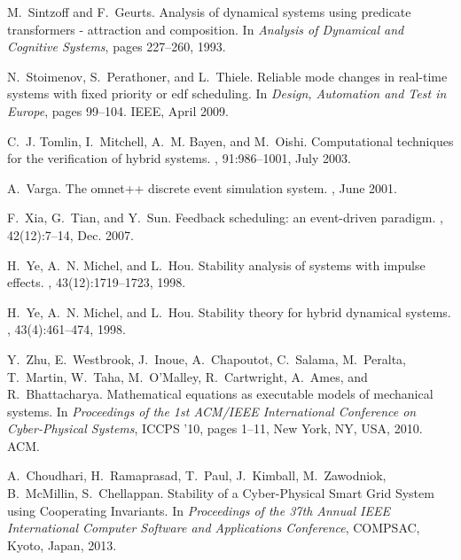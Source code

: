 \documentclass{sig-alternate-ipsn13}
\begin{document}
\begin{thebibliography}{10}
M.~Sintzoff and F.~Geurts.
\newblock Analysis of dynamical systems using predicate transformers -
  attraction and composition.
\newblock In {\em Analysis of Dynamical and Cognitive Systems}, pages 227--260,
  1993.

N.~Stoimenov, S.~Perathoner, and L.~Thiele.
\newblock Reliable mode changes in real-time systems with fixed priority or edf
  scheduling.
\newblock In {\em Design, Automation and Test in Europe}, pages 99--104. IEEE,
  April 2009.

C.~J. Tomlin, I.~Mitchell, A.~M. Bayen, and M.~Oishi.
\newblock Computational techniques for the verification of hybrid systems.
, 91:986--1001, July 2003.

A.~Varga.
\newblock The omnet++ discrete event simulation system.
, June 2001.

F.~Xia, G.~Tian, and Y.~Sun.
\newblock Feedback scheduling: an event-driven paradigm.
, 42(12):7--14, Dec. 2007.

H.~Ye, A.~N. Michel, and L.~Hou.
\newblock Stability analysis of systems with impulse effects.
, 43(12):1719--1723,
  1998.

H.~Ye, A.~N. Michel, and L.~Hou.
\newblock Stability theory for hybrid dynamical systems.
, 43(4):461--474, 1998.

Y.~Zhu, E.~Westbrook, J.~Inoue, A.~Chapoutot, C.~Salama, M.~Peralta, T.~Martin,
  W.~Taha, M.~O'Malley, R.~Cartwright, A.~Ames, and R.~Bhattacharya.
\newblock Mathematical equations as executable models of mechanical systems.
\newblock In {\em Proceedings of the 1st ACM/IEEE International Conference on
  Cyber-Physical Systems}, ICCPS '10, pages 1--11, New York, NY, USA, 2010.
  ACM.



A.~Choudhari, H.~Ramaprasad, T.~Paul, J.~Kimball, M.~Zawodniok, B.~McMillin, S.~Chellappan.
\newblock Stability of a Cyber-Physical Smart Grid System using Cooperating Invariants.
\newblock In {\em Proceedings of the 37th Annual IEEE International Computer Software and 
Applications Conference}, COMPSAC, Kyoto, Japan, 2013.


\end{thebibliography}
\end{document}
